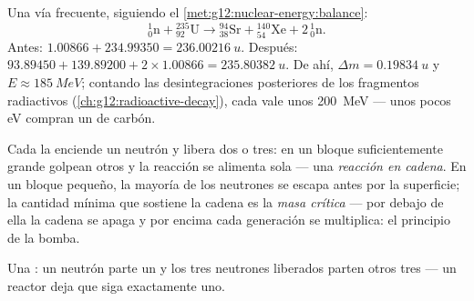 \begin{example}\label{ex:g12:nuclear-energy:fissionbalance}
Una vía frecuente, siguiendo el \cref{met:g12:nuclear-energy:balance}:
\[
{}^{1}_{0}\mathrm{n} + {}^{235}_{92}\mathrm{U} \longrightarrow
{}^{94}_{38}\mathrm{Sr} + {}^{140}_{54}\mathrm{Xe} + 2\,{}^{1}_{0}\mathrm{n}.
\]
Antes: $1.00866 + 234.99350 = \qty{236.00216}{u}$. Después:
$93.89450 + 139.89200 + 2 \times 1.00866 = \qty{235.80382}{u}$. De ahí,
$\Delta m = \qty{0.19834}{u}$ y $E \approx \qty{185}{MeV}$; contando las
desintegraciones posteriores de los fragmentos radiactivos
(\cref{ch:g12:radioactive-decay}), cada  vale unos \qty{200}{MeV} --- unos pocos
\unit{eV} compran un  de carbón.
\end{example}

\begin{definition}\label{def:g12:nuclear-energy:chain}
Cada  la enciende un neutrón y libera dos o tres: en un bloque suficientemente
grande golpean otros  y la reacción se alimenta sola --- una \emph{reacción en
cadena}. En un bloque pequeño, la mayoría de los neutrones
se escapa antes por la superficie; la cantidad mínima que sostiene la cadena es la
\emph{masa crítica} --- por debajo de ella la cadena se apaga y
por encima cada generación se multiplica: el principio de la bomba.
\end{definition}

\begin{omfigure}

{\small Una : un neutrón parte un  y los tres neutrones
liberados parten otros tres --- un reactor deja que siga exactamente uno.}
\end{omfigure}

